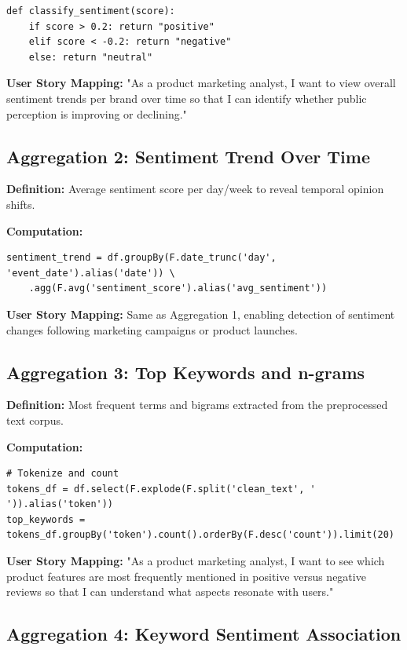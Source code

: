 \documentclass[12pt]{article}
\begin{document}
\begin{lstlisting}
def classify_sentiment(score):
    if score > 0.2: return "positive"
    elif score < -0.2: return "negative"
    else: return "neutral"
\end{lstlisting}

\textbf{User Story Mapping:} "As a product marketing analyst, I want to view overall sentiment trends per brand over time so that I can identify whether public perception is improving or declining."

\subsection{Aggregation 2: Sentiment Trend Over Time}

\textbf{Definition:} Average sentiment score per day/week to reveal temporal opinion shifts.

\textbf{Computation:}
\begin{lstlisting}
sentiment_trend = df.groupBy(F.date_trunc('day', 'event_date').alias('date')) \
    .agg(F.avg('sentiment_score').alias('avg_sentiment'))
\end{lstlisting}

\textbf{User Story Mapping:} Same as Aggregation 1, enabling detection of sentiment changes following marketing campaigns or product launches.

\subsection{Aggregation 3: Top Keywords and n-grams}

\textbf{Definition:} Most frequent terms and bigrams extracted from the preprocessed text corpus.

\textbf{Computation:}
\begin{lstlisting}
# Tokenize and count
tokens_df = df.select(F.explode(F.split('clean_text', ' ')).alias('token'))
top_keywords = tokens_df.groupBy('token').count().orderBy(F.desc('count')).limit(20)
\end{lstlisting}

\textbf{User Story Mapping:} "As a product marketing analyst, I want to see which product features are most frequently mentioned in positive versus negative reviews so that I can understand what aspects resonate with users."

\subsection{Aggregation 4: Keyword Sentiment Association}
\end{document}
